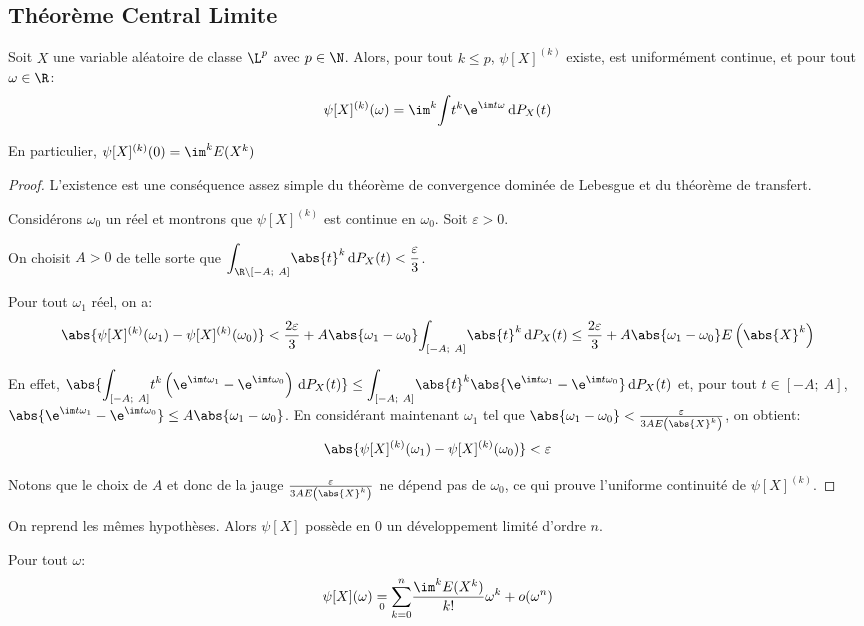 \subsection{Théorème Central Limite}


\begin{prop}
Soit $X$ une variable aléatoire de classe $\L^p$ avec $p \in \N$. Alors, pour tout $k \leq p$, $\psi[X]^{(k)}$ existe, est uniformément continue, et pour tout $\omega \in \R$:
\[
\psi[X]^{(k)}(\omega) = \im^k \displaystyle{\int} t^k \e^{\im t \omega} \, \mathrm d P_X(t)
\]

En particulier, $\psi[X]^{(k)}(0) = \im^k E(X^k)$
\end{prop}

\begin{proof}
L'existence est une conséquence assez simple du théorème de convergence dominée de Lebesgue et du théorème de transfert. 


\medskip
Considérons $\omega_0$ un réel et montrons que $\psi[X]^{(k)}$ est continue en $\omega_0$. Soit $\varepsilon>0$.

\medskip
On choisit $A>0$ de telle sorte que $\displaystyle{\int_{\R \backslash [-A;~A]}} \abs{t}^k \, \mathrm d P_X(t) < \frac{\varepsilon}{3}$.

Pour tout $\omega_1$ réel, on a:
\[
\abs{\psi[X]^{(k)}(\omega_1)-\psi[X]^{(k)}(\omega_0)} < \frac{2 \varepsilon}{3} + A \abs{\omega_1 - \omega_0} \displaystyle{\int_{[-A;~A]}} \abs{t}^k \, \mathrm d P_X(t) \leq \frac{2 \varepsilon}{3} + A \abs{\omega_1 - \omega_0} E\left (\abs{X}^k\right )
\]

En effet, $\abs{\displaystyle{\int_{[-A;~A]}} t^k \left (\e^{\im t \omega_1} -  \e^{\im t \omega_0} \right ) \, \mathrm d P_X(t)} \leq \displaystyle{\int_{[-A;~A]}} \abs{t}^k \abs{\e^{\im t \omega_1} -  \e^{\im t \omega_0}} \, \mathrm d P_X(t)$  et, pour tout $t \in [-A;~A]$, $\abs{\e^{\im t \omega_1} -  \e^{\im t \omega_0}} \leq A \abs{\omega_1 - \omega_0}$. En considérant maintenant $\omega_1$ tel que $\abs{\omega_1 - \omega_0} < \frac{\varepsilon}{3 A E\left (\abs{X}^k\right )}$, on obtient:
\[
\abs{\psi[X]^{(k)}(\omega_1)-\psi[X]^{(k)}(\omega_0)} < \varepsilon
\]

Notons que le choix de $A$ et donc de la jauge $\frac{\varepsilon}{3 A E\left (\abs{X}^k\right )}$ ne dépend pas de $\omega_0$, ce qui prouve l'uniforme continuité de $\psi[X]^{(k)}$.
\end{proof}

\begin{cor}
On reprend les mêmes hypothèses. Alors $\psi[X]$ possède en $0$ un développement limité d'ordre $n$. 

Pour tout $\omega$:
\[
\psi[X](\omega) \underset{0}{=} \displaystyle{\sum_{k=0}^n} \frac{\im^k E(X^k)}{k!} \omega^k + o(\omega^n)
\]
\end{cor}

